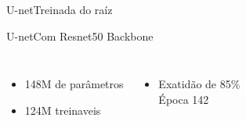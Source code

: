 




\begin{frame}[c]{U-net}{Treinada do raíz}

    \begin{figure}[ht]
        \centering
        \plotA
        \plotB
    \end{figure}

\end{frame}


\begin{frame}[c]{U-net}{Com Resnet50 Backbone}

    \begin{columns}

          \begin{itemize}
                \item 148M de parâmetros
                \item 124M treinaveis
          \end{itemize}
    
        \begin{itemize}
          \item Exatidão de 85\% \\Época 142
        \end{itemize}
    
    
      \end{columns}
    
  \end{frame}

